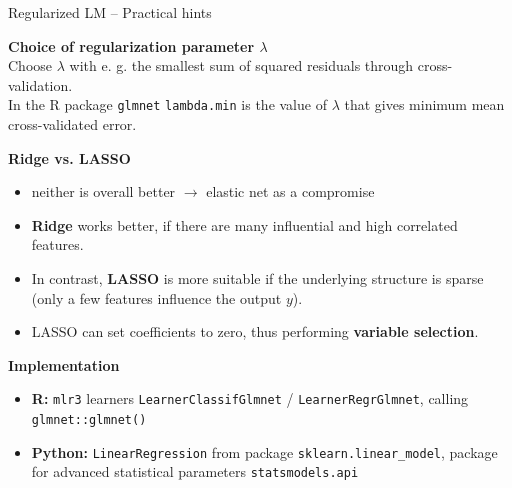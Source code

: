 \documentclass[11pt,compress,t,notes=noshow, xcolor=table]{beamer}
\newcommand{\highlight}[1]{\textcolor{highlightcol}{\textbf{#1}}}
\let\code=\texttt
\begin{document}
\begin{frame}{Regularized LM -- Practical hints}

\footnotesize

  \highlight{Choice of regularization parameter  $\lambda$} \\

 Choose $\lambda$ with e. g. the smallest sum of squared residuals through cross-validation. \\
 In the R package \code{glmnet} \code{lambda.min} is the value of $\lambda$ that gives minimum mean cross-validated error.
 
\medskip

\highlight{Ridge vs. LASSO} \\
\begin{itemize}
    \item neither is overall better $\rightarrow$ elastic net as a compromise
    \item \textbf{Ridge} works better, if there are many influential and high correlated features. 
    \item In contrast, \textbf{LASSO} is more suitable if the underlying structure is sparse (only a few features influence the output $y$).
    \item LASSO can set coefficients to zero, thus performing \textbf{variable selection}. 
  \end{itemize}


\medskip

\highlight{Implementation}

\begin{itemize}
    \item \textbf{R:} \code{mlr3} learners \code{LearnerClassifGlmnet} / 
    \code{LearnerRegrGlmnet}, calling \code{glmnet::glmnet()}
    \item \textbf{Python:} \code{LinearRegression} from package 
    \code{sklearn.linear\_model}, package for advanced statistical parameters 
    \code{statsmodels.api} 
  \end{itemize}

\end{frame}

\end{document}
